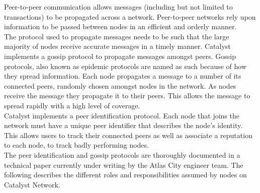 Peer-to-peer communication allows messages (including but not limited to transactions) to be propagated across a network. Peer-to-peer networks rely upon information to be passed between nodes in an efficient and orderly manner. \\


The protocol used to propagate messages needs to be such that the large majority of nodes receive accurate messages in a timely manner. Catalyst implements a gossip protocol to propagate messages amongst peers. Gossip protocols, also known as epidemic protocols are named as such because of how they spread information. Each node propagates a message to a number of its connected peers, randomly chosen amongst nodes in the network. As nodes receive the message they propagate it to their peers. This allows the message to spread rapidly with a high level of coverage. \\

Catalyst implements a peer identification protocol. Each node that joins the network must have a unique peer identifier that describes the node’s identity. This allows users to track their connected peers as well as associate a reputation to each node, to track badly performing nodes. \\

The peer identification and gossip protocols are thoroughly documented in a technical paper currently under writing by the Atlas City engineer team. The following describes the different roles and responsibilities assumed by nodes on Catalyst Network. 
